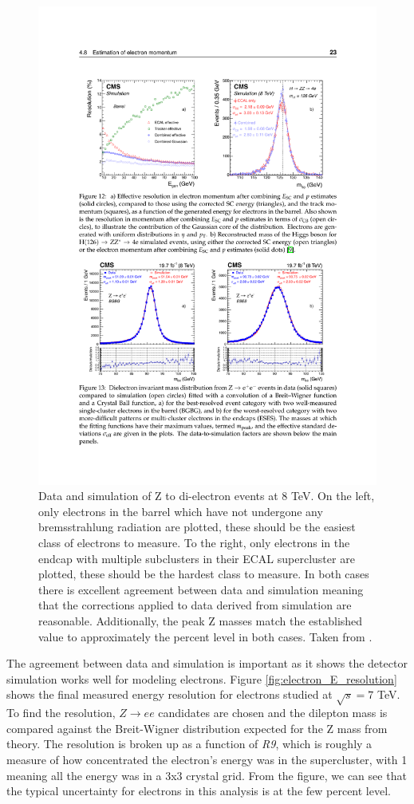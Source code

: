     \begin{figure}[h!]
      \centering
      \includegraphics[width=.9\textwidth]{figures/electron_Z_resolution.pdf}
      \caption{Data and simulation of Z to di-electron events at 8 TeV. On the left, only electrons in the barrel which have not undergone any bremsstrahlung radiation are plotted, these should be the easiest class of electrons to measure. To the right, only electrons in the endcap with multiple subclusters in their ECAL supercluster are plotted, these should be the hardest class to measure. In both cases there is excellent agreement between data and simulation meaning that the corrections applied to data derived from simulation are reasonable. Additionally, the peak Z masses match the established value to approximately the percent level in both cases. Taken from \cite{Electron_reco}.}
      \label{fig:electron_Z_resolution}
    \end{figure}

    The agreement between data and simulation is important as it shows the detector simulation works well for modeling electrons. Figure \ref{fig:electron_E_resolution} shows the final measured energy resolution for electrons studied at $\sqrt{s} = 7$ TeV. To find the resolution, $Z \to ee$ candidates are chosen and the dilepton mass is compared against the Breit-Wigner distribution expected for the Z mass from theory. The resolution is broken up as a function of \emph{R9}, which is roughly a measure of how concentrated the electron's energy was in the supercluster, with 1 meaning all the energy was in a 3x3 crystal grid. From the figure, we can see that the typical uncertainty for electrons in this analysis is at the few percent level. 


